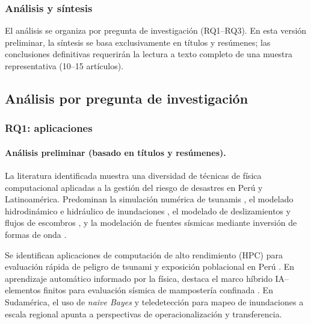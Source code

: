 \documentclass[12pt,a4paper]{article}
\begin{document}
\subsubsection{Análisis y síntesis}
El análisis se organiza por pregunta de investigación (RQ1--RQ3). En esta versión preliminar, la síntesis se basa exclusivamente en títulos y resúmenes; las conclusiones definitivas requerirán la lectura a texto completo de una muestra representativa (10--15 artículos).

\subsection{Análisis por pregunta de investigación}
\subsubsection{RQ1: aplicaciones}
\label{sec:rq1}
\paragraph*{Análisis preliminar (basado en títulos y resúmenes).}
La literatura identificada muestra una diversidad de técnicas de física computacional aplicadas a la gestión del riesgo de desastres en Perú y Latinoamérica. Predominan la simulación numérica de tsunamis \parencite{jimnez2023numerical, androsov2024nonlinear, davila2025probabilistic, garcia2025parallel}, el modelado hidrodinámico e hidráulico de inundaciones \parencite{fagundes2021sediment, fleischmann2021regional, escobarsilva2023assessing, saavedra2026impact}, el modelado de deslizamientos y flujos de escombros \parencite{marin2021assessing, ochoacornejo2025rock, meyrat2024simulating, flores2026numerical}, y la modelación de fuentes sísmicas mediante inversión de formas de onda \parencite{jimnez2021seismic, moreno2025tsunami, jimenez2024numerical, jimenez2025numerical, jimnez2023seismic, jiang2023estimation}. 

Se identifican aplicaciones de computación de alto rendimiento (HPC) para evaluación rápida de peligro de tsunami y exposición poblacional en Perú \parencite{garcia2025parallel}. En aprendizaje automático informado por la física, destaca el marco híbrido IA--elementos finitos para evaluación sísmica de mampostería confinada \parencite{yupanqui2025hybrid}. En Sudamérica, el uso de \textit{naive Bayes} y teledetección para mapeo de inundaciones a escala regional \parencite{kuchinski2025regional} apunta a perspectivas de operacionalización y transferencia. 
\end{document}
